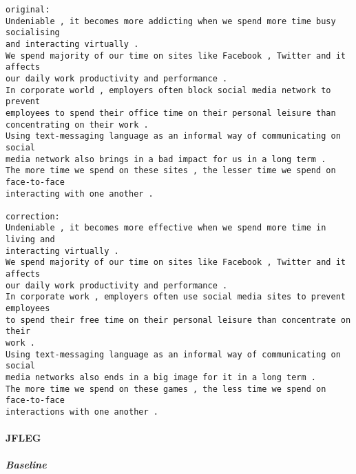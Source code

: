 \documentclass[10pt]{article}
\begin{document}
    \begin{Verbatim}[commandchars=\\\{\}]
original:
Undeniable , it becomes more addicting when we spend more time busy socialising
and interacting virtually .
We spend majority of our time on sites like Facebook , Twitter and it affects
our daily work productivity and performance .
In corporate world , employers often block social media network to prevent
employees to spend their office time on their personal leisure than
concentrating on their work .
Using text-messaging language as an informal way of communicating on social
media network also brings in a bad impact for us in a long term .
The more time we spend on these sites , the lesser time we spend on face-to-face
interacting with one another .

correction:
Undeniable , it becomes more effective when we spend more time in living and
interacting virtually .
We spend majority of our time on sites like Facebook , Twitter and it affects
our daily work productivity and performance .
In corporate work , employers often use social media sites to prevent employees
to spend their free time on their personal leisure than concentrate on their
work .
Using text-messaging language as an informal way of communicating on social
media networks also ends in a big image for it in a long term .
The more time we spend on these games , the less time we spend on face-to-face
interactions with one another .
    \end{Verbatim}

    \hypertarget{jfleg}{%
\paragraph{JFLEG}\label{jfleg}}

    \hypertarget{baseline}{%
\subparagraph{Baseline}\label{baseline}}
\end{document}
